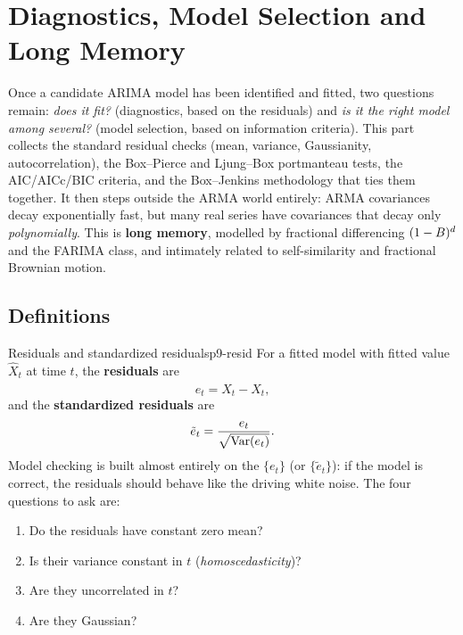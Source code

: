 \section{Diagnostics, Model Selection and Long Memory}
\label{sec:diagnostics}

Once a candidate ARIMA model has been identified and fitted, two questions
remain: \emph{does it fit?} (diagnostics, based on the residuals) and \emph{is
it the right model among several?} (model selection, based on information
criteria). This part collects the standard residual checks (mean, variance,
Gaussianity, autocorrelation), the Box--Pierce and Ljung--Box portmanteau
tests, the AIC/AICc/BIC criteria, and the Box--Jenkins methodology that ties
them together. It then steps outside the ARMA world entirely: ARMA covariances
decay exponentially fast, but many real series have covariances that decay only
\emph{polynomially}. This is \textbf{long memory}, modelled by fractional
differencing $(1-B)^d$ and the FARIMA class, and intimately related to
self-similarity and fractional Brownian motion.

\subsection{Definitions}

\begin{definition}{Residuals and standardized residuals}{p9-resid}
For a fitted model with fitted value $\hat X_t$ at time $t$, the
\textbf{residuals} are
\[
e_t = X_t - \hat X_t ,
\]
and the \textbf{standardized residuals} are
\[
\tilde e_t = \frac{e_t}{\sqrt{\operatorname{Var}(e_t)}} .
\]
Model checking is built almost entirely on the $\{e_t\}$ (or $\{\tilde e_t\}$):
if the model is correct, the residuals should behave like the driving white
noise. The four questions to ask are:
\begin{enumerate}
  \item Do the residuals have constant zero mean?
  \item Is their variance constant in $t$ (\emph{homoscedasticity})?
  \item Are they uncorrelated in $t$?
  \item Are they Gaussian?
\end{enumerate}
\end{definition}

